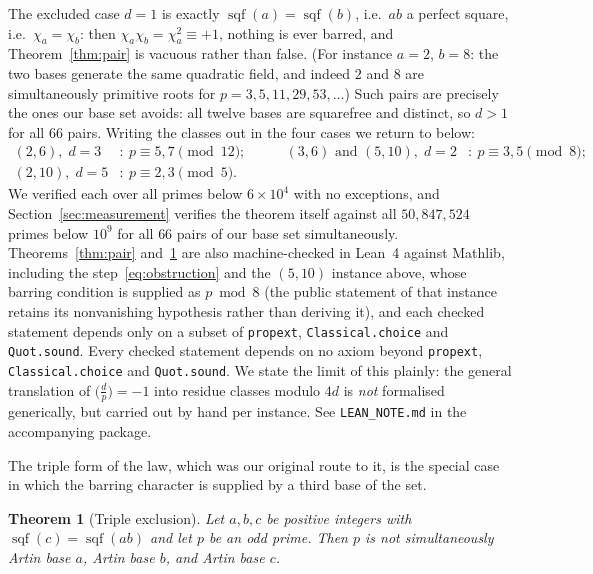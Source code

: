 \documentclass[11pt,reqno]{amsart}
\theoremstyle{plain}
\newtheorem{theorem}{Theorem}
\theoremstyle{definition}
\DeclareMathOperator{\sqf}{sqf}
\begin{document}
The excluded case $d = 1$ is exactly $\sqf(a) = \sqf(b)$, i.e.\ $ab$ a perfect
square, i.e.\ $\chi_a = \chi_b$: then $\chi_a \chi_b = \chi_a^2 \equiv +1$,
nothing is ever barred, and Theorem~\ref{thm:pair} is vacuous rather than
false. (For instance $a = 2$, $b = 8$: the two bases generate the same
quadratic field, and indeed $2$ and $8$ are simultaneously primitive roots for
$p = 3, 5, 11, 29, 53, \ldots$) Such pairs are precisely the ones our base set
avoids: all twelve bases are squarefree and distinct, so $d > 1$ for all $66$
pairs. Writing the classes out in the four cases we return to below:
\[
  \begin{aligned}
    (2,6),\; d = 3&\!: \ p \equiv 5, 7 \!\!\pmod{12}; &\qquad
    (3,6) \text{ and } (5,10),\; d = 2&\!: \ p \equiv 3, 5 \!\!\pmod 8; \\
    (2,10),\; d = 5&\!: \ p \equiv 2, 3 \!\!\pmod 5 .
  \end{aligned}
\]
We verified each over all primes below $6 \times 10^4$ with no exceptions, and
Section~\ref{sec:measurement} verifies the theorem itself against all
$50{,}847{,}524$ primes below $10^9$ for all $66$ pairs of our base set
simultaneously. Theorems~\ref{thm:pair} and~\ref{thm:triple} are also
machine-checked in Lean~4 against Mathlib, including the
step~\eqref{eq:obstruction} and the $(5,10)$ instance above, whose barring
condition is supplied as $p \bmod 8$ (the public statement of that instance
retains its nonvanishing hypothesis rather than deriving it), and each checked
statement depends only on a subset of \texttt{propext}, \texttt{Classical.choice}
and \texttt{Quot.sound}. Every checked statement depends on no
axiom beyond \texttt{propext}, \texttt{Classical.choice} and
\texttt{Quot.sound}. We state the limit of this plainly: the general
translation of $\bigl(\tfrac{d}{p}\bigr) = -1$ into residue classes
modulo $4d$ is \emph{not} formalised generically, but carried out by hand per
instance. See \texttt{LEAN\_NOTE.md} in the accompanying package.

The triple form of the law, which was our original route to it, is the special
case in which the barring character is supplied by a third base of the set.

\begin{theorem}[Triple exclusion]
\label{thm:triple}
Let $a, b, c$ be positive integers with $\sqf(c) = \sqf(ab)$ and let $p$ be an
odd prime. Then $p$ is not simultaneously Artin base $a$, Artin base $b$, and
Artin base $c$.
\end{theorem}
\end{document}
